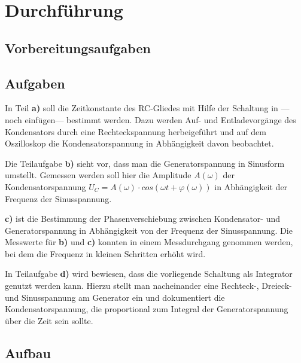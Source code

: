 \section{Durchführung}
\label{sec:Durchfuehrung}

\subsection{Vorbereitungsaufgaben}



\subsection{Aufgaben}
\label{subsec:Aufgaben}

In Teil \textbf{a)} soll die Zeitkonstante des RC-Gliedes mit Hilfe der Schaltung in
---noch einfügen--- bestimmt werden. 
Dazu werden Auf- und Entladevorgänge des Kondensators 
durch eine Rechteckspannung herbeigeführt und auf dem Oszilloskop die Kondensatorspannung in 
Abhängigkeit davon beobachtet.

Die Teilaufgabe \textbf{b)} sieht vor, dass man die Generatorspannung in Sinusform umstellt.
Gemessen werden soll hier die Amplitude $A(\omega)$ der Kondensatorspannung
 $U_C = A(\omega) \cdot cos(\omega t + \varphi(\omega))$ in Abhängigkeit der Frequenz
der Sinusspannung.

\textbf{c)} ist die Bestimmung der Phasenverschiebung zwischen Kondensator- und 
Generatorspannung in Abhängigkeit von der Frequenz der Sinusspannung. Die Messwerte für \textbf{b)} und \textbf{c)} konnten in einem 
Messdurchgang genommen werden, bei dem die Frequenz in kleinen Schritten erhöht wird.

In Teilaufgabe \textbf{d)} wird bewiesen, dass die vorliegende Schaltung als Integrator genutzt werden kann.
Hierzu stellt man nacheinander eine Rechteck-, Dreieck- und Sinusspannung am Generator ein und dokumentiert 
die Kondensatorspannung, die proportional zum Integral der Generatorspannung über die Zeit sein sollte.



\subsection{Aufbau}
\label{subsec:Aufbau}


